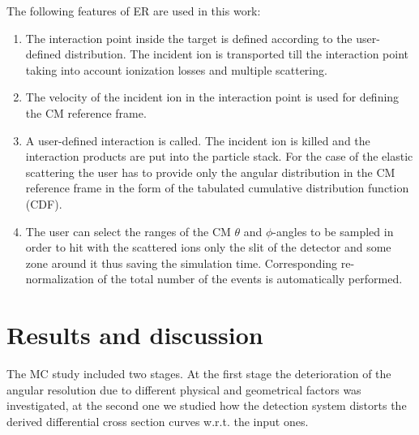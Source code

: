 \documentclass[%
 aip,
cp,  %
 amsmath,amssymb,%
 reprint,%
]{revtex4-2}
\begin{document}
The following features of ER are used in this work:
\begin{enumerate}
\item The interaction point inside the target is defined according to the user-defined distribution. The incident ion is transported till the interaction point taking into account ionization losses and multiple scattering.
\item The velocity of the incident ion in the interaction point is used for defining the CM reference frame.
\item A user-defined interaction is called. The incident ion is killed and the interaction products are put into the particle stack. For the case of the elastic scattering the user has to provide only the angular distribution in the CM reference frame in the form of the tabulated cumulative distribution function (CDF).
\item The user can select the ranges of the CM $\theta$ and $\phi$-angles to be sampled in order to hit with the scattered ions only the slit of the detector and some zone around it thus saving the simulation time.  Corresponding re-normalization of the total number of the events is automatically performed.
\end{enumerate}

\section{Results and discussion}

The MC study included two stages. At the first stage the deterioration of the angular resolution due to different physical and geometrical factors  was investigated, at the second one we studied how the detection system distorts the derived differential cross section curves w.r.t. the input ones.
\end{document}
